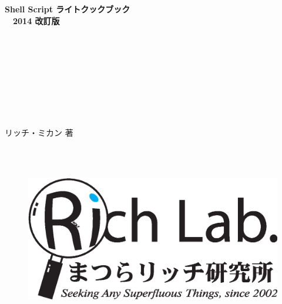 

\thispagestyle{empty}
\begin{center}

　\\
　\\
　\\
　\\
　\\
　\\
　\\
　\\
　\\

\noindent
\Huge{\textbf{Shell Script ライトクックブック}} \\
\Huge{\textbf{　2014 改訂版}}
　\\
　\\
\noindent
\textbf{\LARGE{　}}

　\\
　\\
　\\
　\\
　\\
　\\

\noindent
\Large{リッチ・ミカン 著}

　\\
　\\

\begin{figure}[!h]
	\begin{center}
		\vspace{-1cm}
		\includegraphics*[scale=0.25]{tex/0_introduction/figs/MRL_logo_2007_outlined.eps}
		\vspace{-5cm}
	\end{center}
\end{figure}


\end{center}
\clearpage

